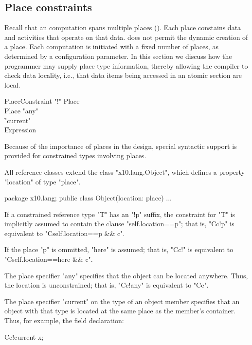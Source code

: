 \subsection{Place constraints}\label{PlaceTypes}
\label{DepType:PlaceType}

Recall that an \Xten{} computation spans multiple places
(). Each place constains data and activities that
operate on that data.  \XtenCurrVer{} does not permit the dynamic
creation of a place. Each \Xten{} computation is initiated with a
fixed number of places, as determined by a configuration parameter.
In this section we discuss how the programmer may supply place type
information, thereby allowing the compiler to check data locality,
i.e., that data items being accessed in an atomic section are local.

\begin{grammar}
PlaceConstraint     \: \xcd"!" Place\opt \\
Place              \:  \xcd"any" \\
                        \| \xcd"current" \\
                        \| Expression \\
\end{grammar}

Because of the importance of places in the \Xten{} design, special
syntactic support is provided for constrained types involving places.

All \Xten{} reference classes extend the class
\xcd"x10.lang.Object", which defines a property
\xcd"location" of type
\xcd"place".

\begin{xten}
package x10.lang;
public class Object(location: place) { ... }  
\end{xten}

If a constrained reference type \xcd"T" has an \xcd"!p" suffix,
the constraint for \xcd"T" is implicitly assumed to contain the clause
\xcd"self.location==p"; that is,
\xcd"C{c}!p" is equivalent to \xcd"C{self.location==p && c}".

If the place \xcd"p" is ommitted, \xcd"here" is assumed; that is,
\xcd"C{c}!" is equivalent to \xcd"C{self.location==here && c}".

The place specifier \xcd"any" specifies that the object can be
located anywhere.  Thus, the location is unconstrained; that is,
\xcd"C{c}!any" is equivalent to \xcd"C{c}".

The place specifier \xcd"current" on the type of an object
member specifies that an object with that type is located at the
same place as the member's container.
Thus, for example, the field declaration:
\begin{xten}
    C{c}!current x;
\end{xten}

